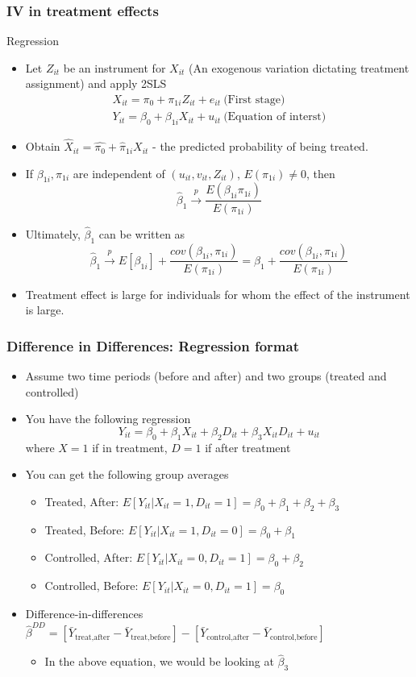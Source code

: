 \documentclass[aspectratio=169]{beamer}
\begin{document}
\begin{frame}
\frametitle{IV in treatment effects}
Regression
\begin{itemize}
\item Let $Z_{it}$ be an instrument for $X_{it}$ (An exogenous variation dictating treatment assignment) and apply 2SLS 
\begin{gather*}
X_{it} = \pi_0+\pi_{1i}Z_{it}+e_{it} \ \text{(First stage)}\\
Y_{it} = \beta_0+\beta_{1i}X_{it}+u_{it} \ \text{(Equation of interst)}
\end{gather*}
\item Obtain $\hat{X}_{it}=\hat{\pi_0}+\hat{\pi}_{1i}X_{it}$ - the predicted probability of being treated. 
\item If $\beta_{1i}, \pi_{1i}$ are independent of $(u_{it},v_{it}, Z_{it})$, $E(\pi_{1i})\neq0$, then
\[
\hat{\beta}_{1}\xrightarrow{p}\frac{E(\beta_{1i}\pi_{1i})}{E(\pi_{1i})} 
\]
\item Ultimately, $\hat{\beta}_1$ can be written as 
\[
\hat{\beta}_{1}\xrightarrow{p} E[\beta_{1i}]+\frac{cov(\beta_{1i},\pi_{1i})}{E(\pi_{1i})} = \beta_1+\frac{cov(\beta_{1i},\pi_{1i})}{E(\pi_{1i})}
\]
\item Treatment effect is large for individuals for whom the effect of the instrument is large.
\end{itemize}
\end{frame}


\begin{frame}
\frametitle{Difference in Differences: Regression format}
\begin{itemize}
\item Assume two time periods (before and after) and two groups (treated and controlled)
\item You have the following regression
\[
Y_{it} = \beta_0 + \beta_1 X_{it} + \beta_2 D_{it} + \beta_3 X_{it}D_{it}+u_{it}
\]
where $X=1$ if in treatment, $D=1$ if after treatment
\item You can get the following group averages
\begin{itemize}
\item Treated, After: $E[Y_{it}|X_{it}=1, D_{it}=1] = \beta_0+\beta_1 + \beta_2 + \beta_3$
\item Treated, Before: $E[Y_{it}|X_{it}=1, D_{it}=0] =\beta_0+ \beta_1 $ 
\item Controlled, After: $E[Y_{it}|X_{it}=0, D_{it}=1] =\beta_0+ \beta_2 $
\item Controlled, Before: $E[Y_{it}|X_{it}=0, D_{it}=1] =\beta_0 $ 
\end{itemize}
\item Difference-in-differences  $\hat{\beta}^{DD}=[\bar{Y}_{\text{treat,after}}-\bar{Y}_{\text{treat,before}}]-[\bar{Y}_{\text{control,after}}-\bar{Y}_{\text{control,before}}]$
\begin{itemize}
\item In the above equation, we would be looking at $\hat{\beta}_3$
\end{itemize}
\end{itemize}
\end{frame}
\end{document}
